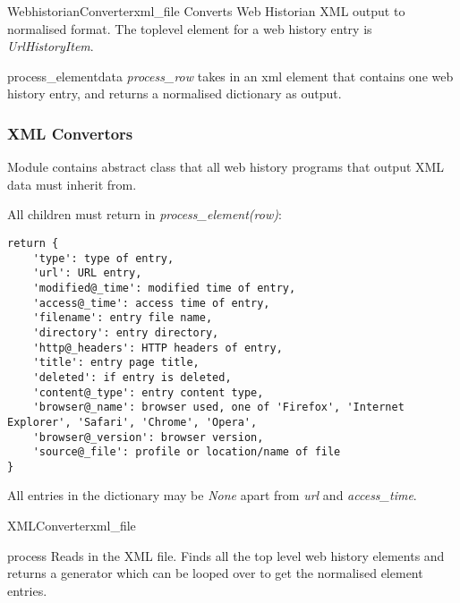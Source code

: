 \documentclass[letterpaper,10pt,english]{manual}
\begin{document}
\hypertarget{webscavator.converters.webhistorian.WebhistorianConverter}{}\begin{classdesc}{WebhistorianConverter}{xml\_file}
Converts Web Historian XML output to normalised format. The toplevel element for a web history
entry is \emph{UrlHistoryItem}.

\hypertarget{webscavator.converters.webhistorian.WebhistorianConverter.process_element}{}\begin{methoddesc}{process\_element}{data}
\emph{process\_row} takes in an xml element that contains one web history entry, 
and returns a normalised dictionary as output.
\end{methoddesc}
\end{classdesc}
\hypertarget{module-webscavator.converters.xml_converter}{}
\modulesynopsis{}

\subsubsection{XML Convertors}

Module contains abstract class that all web history programs that output XML data must inherit from.

All children must return in \emph{process\_element(row)}:

\begin{Verbatim}[commandchars=@\[\]]
return {
    'type': type of entry, 
    'url': URL entry, 
    'modified@_time': modified time of entry,
    'access@_time': access time of entry,
    'filename': entry file name, 
    'directory': entry directory,
    'http@_headers': HTTP headers of entry,
    'title': entry page title,
    'deleted': if entry is deleted,
    'content@_type': entry content type,
    'browser@_name': browser used, one of 'Firefox', 'Internet Explorer', 'Safari', 'Chrome', 'Opera',
    'browser@_version': browser version,
    'source@_file': profile or location/name of file
}
\end{Verbatim}

All entries in the dictionary may be \emph{None} apart from \emph{url} and \emph{access\_time}.

\hypertarget{webscavator.converters.xml_converter.XMLConverter}{}\begin{classdesc}{XMLConverter}{xml\_file}~

\hypertarget{webscavator.converters.xml_converter.XMLConverter.process}{}\begin{methoddesc}{process}{}
Reads in the XML file. Finds all the top level web history elements and 
returns a generator which can be looped over to get the normalised element entries.
\end{methoddesc}
\end{classdesc}
\end{document}

